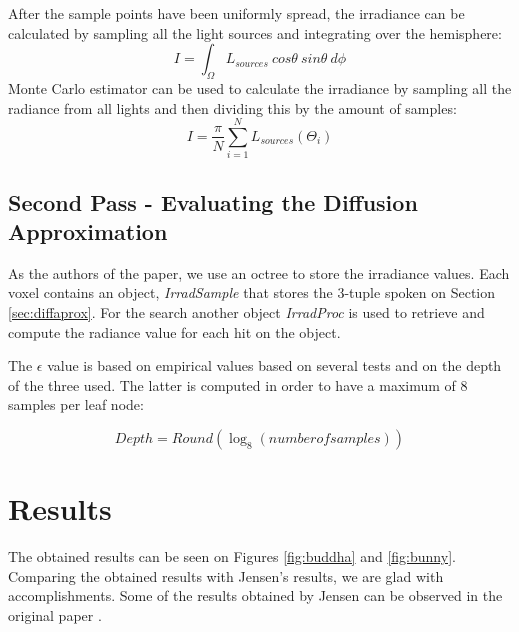 \documentclass{article}
\begin{document}
After the sample points have been uniformly spread, the irradiance can be calculated by sampling all the light sources and integrating over the hemisphere:
\begin{equation}
I = \int_{ \Omega  }^{ } L_{sources} \: cos\theta \: sin\theta \:d\phi 
\end{equation}
Monte Carlo estimator can be used to calculate the irradiance by sampling all the radiance from all lights and then dividing this by the amount of samples:
\begin{equation}
I =  \frac{ \pi }{N } \sum_{i=1}^{ N}L_{sources} \left (  \Theta_i  \right )
\end{equation}

\subsection{Second Pass - Evaluating the Diffusion Approximation}
As the authors of the paper, we use an octree to store the irradiance values. Each voxel contains an object, \textit{IrradSample} that stores the 3-tuple spoken on Section  \ref{sec:diffaprox}. For the search another object \textit{IrradProc} is used to retrieve and compute the radiance value for each hit on the object.

The $\epsilon$ value is based on empirical values based on several tests and on the depth of the three used. The latter is computed in order to have a maximum of 8 samples per leaf node:

\begin{equation}
Depth = Round(\log_8(number of samples))
\end{equation}

\section{Results}
The obtained results can be seen on Figures \ref{fig:buddha} and \ref{fig:bunny}. Comparing the obtained results with Jensen's results, we are glad with accomplishments. Some of the results obtained by Jensen can be observed in the original paper \cite{HierarchicalSSS}.
\end{document}
